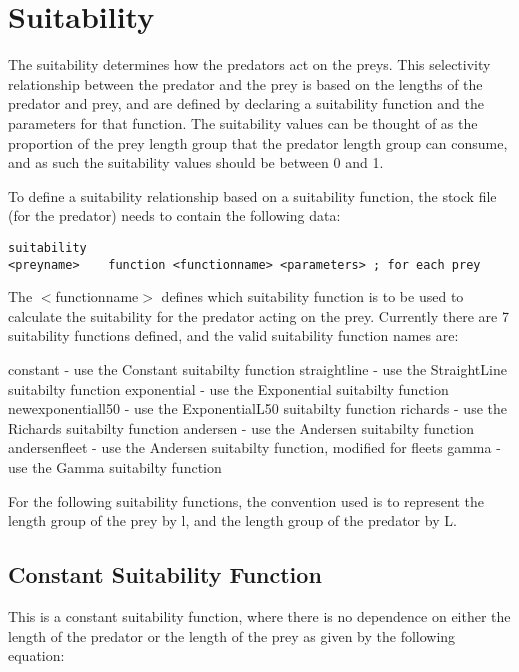 \documentclass[10pt,twoside]{book}
\begin{document}
\section{Suitability}\label{sec:suitability}
The suitability determines how the predators act on the preys.  This selectivity relationship between the predator and the prey is based on the lengths of the predator and prey, and are defined  by declaring a suitability function and the parameters for that function.  The suitability values can be thought of as the proportion of the prey length group that the predator length group can consume, and as such the suitability values should be between 0 and 1.

\bigskip
To define a suitability relationship based on a suitability function, the stock file (for the predator) needs to contain the following data:

{\small\begin{verbatim}
suitability
<preyname>    function <functionname> <parameters> ; for each prey
\end{verbatim}}

The $<$functionname$>$ defines which suitability function is to be used to calculate the suitability for the predator acting on the prey.  Currently there are 7 suitability functions defined, and the valid suitability function names are:

\bigskip
constant - use the Constant suitabilty function\newline
straightline - use the StraightLine suitabilty function\newline
exponential - use the Exponential suitabilty function\newline
newexponentiall50 - use the ExponentialL50 suitabilty function\newline
richards - use the Richards suitabilty function\newline
andersen - use the Andersen suitabilty function\newline
andersenfleet - use the Andersen suitabilty function, modified for fleets\newline
gamma - use the Gamma suitabilty function

\bigskip
For the following suitability functions, the convention used is to represent the length group of the prey by l, and the length group of the predator by L.

\subsection{Constant Suitability Function}
This is a constant suitability function, where there is no dependence on either the length of the predator or the length of the prey as given by the following equation:
\end{document}
